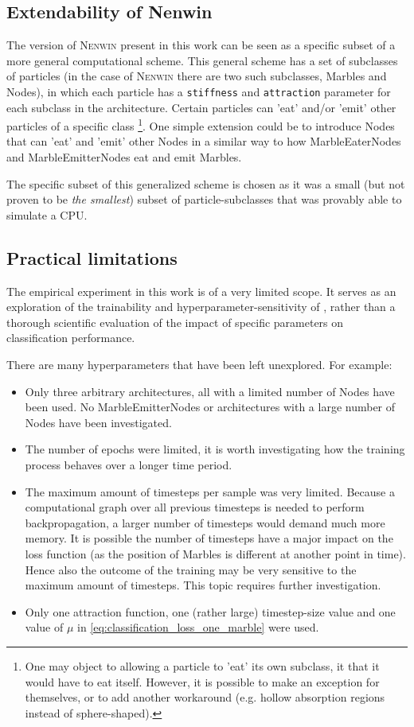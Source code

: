\subsection{Extendability of Nenwin}
The version of \textsc{Nenwin} present in this work can be seen as a specific subset of a more general computational scheme. This general scheme has a set of subclasses of particles (in the case of \textsc{Nenwin} there are two such subclasses, Marbles and Nodes), in which each particle has a \texttt{stiffness} and \texttt{attraction} parameter for each subclass in the architecture. Certain particles can 'eat' and/or 'emit' other particles of a specific class \footnote{One may object to allowing a particle to 'eat' its own subclass, it that it would have to eat itself. However, it is possible to make an exception for themselves, or to add another workaround (e.g. hollow absorption regions instead of sphere-shaped).}. One simple extension could be to introduce Nodes that can 'eat' and 'emit' other Nodes in a similar way to how MarbleEaterNodes and MarbleEmitterNodes eat and emit Marbles.

The specific subset of this generalized scheme is chosen as it was a small (but not proven to be \textit{the smallest}) subset of particle-subclasses that was provably able to simulate a CPU.

\subsection{Practical limitations}
The empirical experiment in this work is of a very limited scope.
It serves as an exploration of the trainability and hyperparameter-sensitivity of \nenwin,
rather than a thorough scientific evaluation of the impact of specific parameters on classification performance.


There are many hyperparameters that have been left unexplored. For example:
\begin{itemize}
	\item Only three arbitrary architectures, all with a limited number of Nodes have been used. No MarbleEmitterNodes or architectures with a large number of Nodes have been investigated.
	\item The number of epochs were limited, it is worth investigating how the training process behaves over a longer time period.
	\item The maximum amount of timesteps per sample was very limited. Because a computational graph over all previous timesteps is needed to perform backpropagation, a larger number of timesteps would demand much more memory. It is possible the number of timesteps have a major impact on the loss function (as the position of Marbles is different at another point in time). Hence also the outcome of the training may be very sensitive to the maximum amount of timesteps. This topic requires further investigation.
	\item Only one attraction function, one (rather large) timestep-size value and one value of $\mu$ in \eqref{eq:classification_loss_one_marble} were used. 
\end{itemize} 


